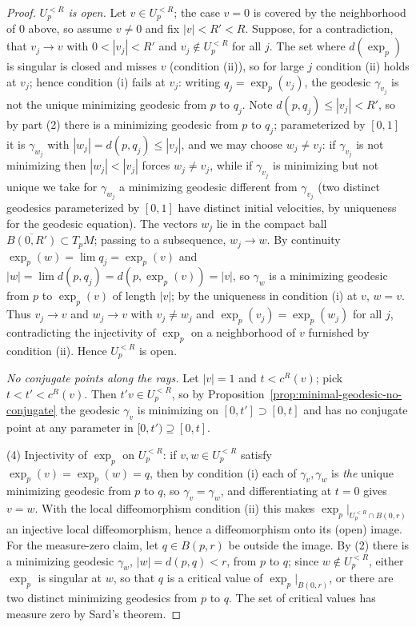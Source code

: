 \begin{proof}
\emph{$U_p^{<R}$ is open.} Let $v\in U_p^{<R}$; the case $v=0$ is
covered by the neighborhood of $0$ above, so assume $v\not=0$ and
fix $|v|<R'<R$. Suppose, for a contradiction, that $v_j\to v$ with
$0<|v_j|<R'$ and $v_j\notin U_p^{<R}$ for all $j$. The set where
$d(\exp_p)$ is singular is closed and misses $v$ (condition
(ii)), so for large $j$ condition (ii) holds at $v_j$; hence
condition (i) fails at $v_j$: writing $q_j=\exp_p(v_j)$, the
geodesic $\gamma_{v_j}$ is not the unique minimizing geodesic from
$p$ to $q_j$. Note $d(p,q_j)\le|v_j|<R'$, so by part (2) there is
a minimizing geodesic from $p$ to $q_j$; parameterized by $[0,1]$
it is $\gamma_{w_j}$ with $|w_j|=d(p,q_j)\le|v_j|$, and we may
choose $w_j\not=v_j$: if $\gamma_{v_j}$ is not minimizing then
$|w_j|<|v_j|$ forces $w_j\not=v_j$, while if $\gamma_{v_j}$ is
minimizing but not unique we take for $\gamma_{w_j}$ a minimizing
geodesic different from $\gamma_{v_j}$ (two distinct geodesics
parameterized by $[0,1]$ have distinct initial velocities, by
uniqueness for the geodesic equation). The vectors $w_j$ lie in
the compact ball $\overline{B(0,R')}\subset T_pM$; passing to a
subsequence, $w_j\to w$. By continuity
$\exp_p(w)=\lim q_j=\exp_p(v)$ and
$|w|=\lim d(p,q_j)=d\left(p,\exp_p(v)\right)=|v|$, so
$\gamma_w$ is a minimizing geodesic from $p$ to $\exp_p(v)$ of
length $|v|$; by the uniqueness in condition (i) at $v$,
$w=v$. Thus $v_j\to v$ and $w_j\to v$ with
$v_j\not=w_j$ and $\exp_p(v_j)=\exp_p(w_j)$ for all $j$,
contradicting the injectivity of $\exp_p$ on a neighborhood of
$v$ furnished by condition (ii). Hence $U_p^{<R}$ is open.

\emph{No conjugate points along the rays.} Let $|v|=1$ and
$t<c^R(v)$; pick $t<t'<c^R(v)$. Then $t'v\in U_p^{<R}$, so by
Proposition~\ref{prop:minimal-geodesic-no-conjugate} the geodesic
$\gamma_v$ is minimizing on $[0,t']\supset[0,t]$ and has no
conjugate point at any parameter in $[0,t')\supseteq[0,t]$.

(4) Injectivity of $\exp_p$ on $U_p^{<R}$: if $v,w\in U_p^{<R}$
satisfy $\exp_p(v)=\exp_p(w)=q$, then by condition (i) each
of $\gamma_v,\gamma_w$ is \emph{the} unique minimizing geodesic
from $p$ to $q$, so $\gamma_v=\gamma_w$, and differentiating at
$t=0$ gives $v=w$. With the local diffeomorphism condition (ii)
this makes $\exp_p|_{U_p^{<R}\cap B(0,r)}$ an injective local
diffeomorphism, hence a diffeomorphism onto its (open)
image. For the measure-zero claim, let $q\in B(p,r)$ be outside the
image. By (2) there is a minimizing geodesic $\gamma_w$,
$|w|=d(p,q)<r$, from $p$ to $q$; since $w\notin U_p^{<R}$, either
$\exp_p$ is singular at $w$, so that $q$ is a critical value of
$\exp_p|_{B(0,r)}$, or there are two distinct minimizing
geodesics from $p$ to $q$. The set of critical values has measure
zero by Sard's theorem.


\end{proof}
